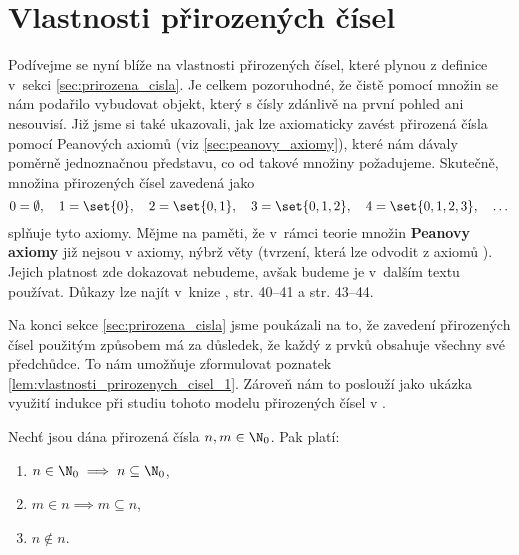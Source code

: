 \section{Vlastnosti přirozených čísel}\label{sec:vlastnosti_prirozenych_cisel}
Podívejme se nyní blíže na vlastnosti přirozených čísel, které plynou z definice v~sekci \ref{sec:prirozena_cisla}. Je celkem pozoruhodné, že čistě pomocí množin se nám podařilo vybudovat objekt, který s čísly zdánlivě na první pohled ani nesouvisí. Již jsme si také ukazovali, jak lze axiomaticky zavést přirozená čísla pomocí Peanových axiomů (viz \ref{sec:peanovy_axiomy}), které nám dávaly poměrně jednoznačnou představu, co od takové množiny požadujeme. Skutečně, množina přirozených čísel zavedená jako
\begin{equation*}
    0=\emptyset,\quad 1=\set{0},\quad 2=\set{0,1},\quad 3=\set{0,1,2},\quad 4=\set{0,1,2,3},\quad\dots
\end{equation*}
splňuje tyto axiomy. Mějme na paměti, že v~rámci teorie množin \textbf{Peanovy axiomy} již nejsou v \ZF{} axiomy, nýbrž věty (tvrzení, která lze odvodit z axiomů \ZF{}). Jejich platnost zde dokazovat nebudeme, avšak budeme je v~dalším textu používat. Důkazy lze najít v~knize \cite{Goldrei2017}, str. 40--41 a str. 43--44.\par
Na konci sekce \ref{sec:prirozena_cisla} jsme poukázali na to, že zavedení přirozených čísel použitým způsobem má za důsledek, že každý z prvků obsahuje všechny své předchůdce.
To nám umožňuje zformulovat poznatek \ref{lem:vlastnosti_prirozenych_cisel_1}. Zároveň nám to poslouží jako ukázka využití indukce při studiu tohoto modelu přirozených čísel v \ZF{}.
\begin{lemma}\label{lem:vlastnosti_prirozenych_cisel_1}
    Nechť jsou dána přirozená čísla $n,m\in\N_0$. Pak platí:
    \begin{enumerate}[label=(\roman*)]
        \item\label{item:vlastnost_1_1} $n\in\N_0\implies n\subseteq\N_0$,
        \item\label{item:vlastnost_1_2} $m\in n\implies m\subseteq n$,
        \item\label{item:vlastnost_1_3} $n\notin n$.
    \end{enumerate}
\end{lemma}
